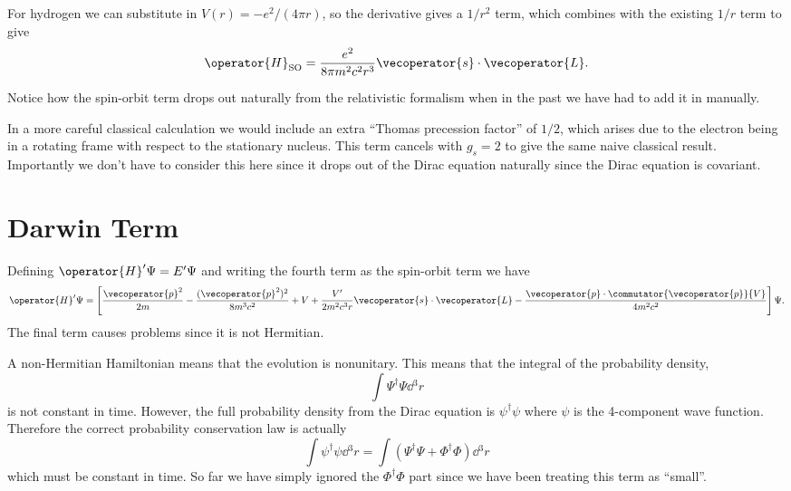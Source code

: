 \documentclass[fleqn]{NotesClass}
\newcommand*{\hermit}{\dagger}
\newcommand*{\hamiltonian}{H}
\begin{document}
    For hydrogen we can substitute in \(V(r) = -e^2/(4\pi r)\), so the derivative gives a \(1/r^2\) term, which combines with the existing \(1/r\) term to give
    \begin{equation}
        \operator{\hamiltonian}_{\mathrm{SO}} = \frac{e^2}{8\pi m^2c^2r^3} \vecoperator{s} \cdot \vecoperator{L}.
    \end{equation}
    
    Notice how the spin-orbit term drops out naturally from the relativistic formalism when in the past we have had to add it in manually.
    
    In a more careful classical calculation we would include an extra \enquote{Thomas precession factor} of \(1/2\), which arises due to the electron being in a rotating frame with respect to the stationary nucleus.
    This term cancels with \(g_s = 2\) to give the same naive classical result.
    Importantly we don't have to consider this here since it drops out of the Dirac equation naturally since the Dirac equation is covariant.
    
    \section{Darwin Term}
    Defining \(\operator{\hamiltonian}'\Psi = E'\Psi\) and writing the fourth term as the spin-orbit term we have
    \begin{equation}
        \operator{\hamiltonian}'\Psi = \left[ \frac{\vecoperator{p}^2}{2m} - \frac{(\vecoperator{p}^2)^2}{8m^3c^2} + V + \frac{V'}{2m^2c^3r}\vecoperator{s}\cdot\vecoperator{L} - \frac{\vecoperator{p} \cdot \commutator{\vecoperator{p}}{V}}{4m^2c^2} \right]\Psi.
    \end{equation}
    The final term causes problems since it is not Hermitian.
    
    A non-Hermitian Hamiltonian means that the evolution is nonunitary.
    This means that the integral of the probability density,
    \begin{equation}
        \int \Psi^\hermit \Psi \dd{^3r}
    \end{equation}
    is not constant in time.
    However, the full probability density from the Dirac equation is \(\psi^\hermit \psi\) where \(\psi\) is the 4-component wave function.
    Therefore the correct probability conservation law is actually
    \begin{equation}
        \int \psi^\hermit \psi \dd{^3r} = \int (\Psi^\hermit \Psi + \Phi^\hermit \Phi) \dd{^3r}
    \end{equation}
    which must be constant in time.
    So far we have simply ignored the \(\Phi^\hermit \Phi\) part since we have been treating this term as \enquote{small}.
    
\end{document}
